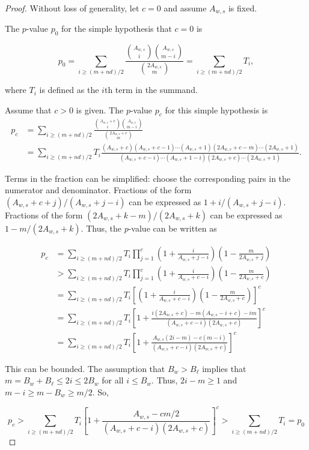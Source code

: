 \begin{proof}
Without loss of generality, let $c=0$ and assume $A_{w,s}$ is fixed.

The $p$-value $p_0$ for the simple hypothesis that $c=0$ is

\begin{equation}
  p_0 = \sum_{i \geq (m+nd)/2} \frac{ {A_{w,s} \choose i}{A_{w,s} \choose m-i} }{{2A_{w,s} \choose m}} = \sum_{i \geq (m+nd)/2} T_i,
\end{equation}

where $T_i$ is defined as the $i$th term in the summand.

Assume that $c>0$ is given.
The $p$-value $p_c$ for this simple hypothesis is
\begin{align*}
p_c &=   \sum_{i \geq (m+nd)/2} \frac{ {A_{w,s}+c \choose i}{A_{w,s} \choose m-i} }{{2A_{w,s}+c \choose m}}  \\
   &= \sum_{i \geq (m+nd)/2} T_i \frac{(A_{w,s} + c)(A_{w,s}+c-1)\cdots(A_{w,s}+1)(2A_{w,s}+c-m)\cdots(2A_{w,s}+1) }
   {(A_{w,s}+c-i)\cdots(A_{w,s}+1-i)(2A_{w,s}+c)\cdots(2A_{w,s}+1)} .
\end{align*}

Terms in the fraction can be simplified: choose the corresponding pairs in the numerator and denominator.
Fractions of the form $(A_{w,s}+c + j)/(A_{w,s}+j-i)$ can be expressed as $1 + i/(A_{w,s}+j-i)$.
Fractions of the form $(2A_{w,s}+k-m)/(2A_{w,s}+k)$ can be expressed as $1 - m/(2A_{w,s}+k)$.
Thus, the $p$-value can be written as 

\begin{align*}
p_c &= \sum_{i \geq (m+nd)/2} T_i \prod_{j=1}^c \left(1 + \frac{i}{A_{w,s} + j - i}\right)\left(1 - \frac{m}{2A_{w,s}+j}\right) \\
&> \sum_{i \geq (m+nd)/2} T_i \prod_{j=1}^c \left(1 + \frac{i}{A_{w,s} + c - i}\right)\left(1 - \frac{m}{2A_{w,s}+c}\right) \\
&= \sum_{i \geq (m+nd)/2} T_i \left[ \left(1 + \frac{i}{A_{w,s} + c - i}\right)\left(1 - \frac{m}{2A_{w,s}+c}\right) \right]^c \\
&= \sum_{i \geq (m+nd)/2} T_i \left[ 1 + \frac{i(2A_{w,s}+c) - m(A_{w,s}-i+c) - im}{(A_{w,s} + c - i)(2A_{w,s}+c)} \right]^c \\
&= \sum_{i \geq (m+nd)/2} T_i \left[ 1 + \frac{A_{w,s}(2i-m) - c(m-i)}{(A_{w,s} + c - i)(2A_{w,s}+c)} \right]^c 
\end{align*}

This can be bounded.
The assumption that $B_w > B_\ell$ implies that $m = B_w+B_\ell \leq 2i \leq 2B_w$ for all $i \leq B_w$.
Thus, $2i-m \geq 1$ and $m-i \geq m-B_w \geq m/2$.
So,

$$p_c >\sum_{i \geq (m+nd)/2} T_i \left[ 1 + \frac{A_{w,s} - cm/2}{(A_{w,s} + c - i)(2A_{w,s}+c)} \right]^c > \sum_{i \geq (m+nd)/2} T_i  = p_0$$





\end{proof}


